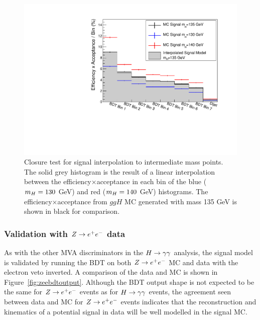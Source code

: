 \begin{figure}
\begin{center}
  \includegraphics[width=.8\textwidth]{hgg7TeV/sidebandMvaPlots/signalModel/sigInterpTest135.pdf}
\end{center}
  \caption{Closure test for signal interpolation to intermediate mass points. The solid grey histogram
  is the result of a linear interpolation between the efficiency$\times$acceptance in each bin of the 
  blue ($m_{H}=130$ GeV) and red ($m_{H}=140$ GeV) histograms. The efficiency$\times$acceptance from $ggH$ MC
  generated with mass 135 GeV is shown in black for comparison.}
  \label{fig:siginterptest}
\end{figure}

\subsubsection{Validation with $Z\rightarrow e^{+}e^{-}$ data}
As with the other MVA discriminators in the $H\rightarrow\gamma\gamma$ analysis, the signal model is validated by running the BDT
on both $Z\rightarrow e^{+}e^{-}$ MC and data with the electron veto inverted. A comparison of the data and MC is shown in 
Figure~\ref{fig:zeebdtoutput}.
Although the BDT output shape is not expected to be  
the same for $Z\rightarrow e^{+}e^{-}$ events as for $H\rightarrow\gamma\gamma$ events, the agreement seen between data and MC for $Z\rightarrow e^{+}e^{-}$ 
events indicates that the reconstruction and kinematics of a potential signal in data will be well
modelled in the signal MC.

